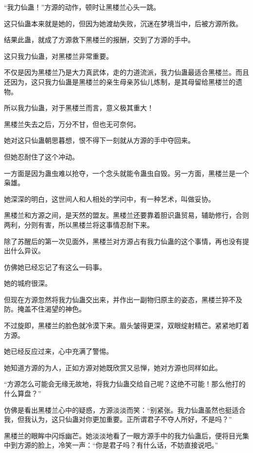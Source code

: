 
\begin{this_body}

“我力仙蛊！”方源的动作，顿时让黑楼兰心头一跳。

这只仙蛊本来就是她的，但因为她渡劫失败，沉迷在梦境当中，后被方源所救。

结果此蛊，就成了方源救下黑楼兰的报酬，交到了方源的手中。

这只我力仙蛊，对黑楼兰非常重要。

不仅是因为黑楼兰乃是大力真武体，走的力道流派，我力仙蛊最适合黑楼兰。而且还因为，这只我力仙蛊是黑楼兰的亲生母亲苏仙儿炼制，是其母留给黑楼兰的遗物。

所以我力仙蛊，对于黑楼兰而言，意义极其重大！

黑楼兰失去之后，万分不甘，但也无可奈何。

她对这只仙蛊朝思暮想，恨不得下一刻就从方源的手中夺回来。

但她忍耐住了这个冲动。

一方面是因为蛊虫难以抢夺，一个念头就能令蛊虫自毁。另一方面，黑楼兰是一个枭雄。

她深深的明白，这世间人和人相处的学问中，有一种艺术，叫做妥协。

黑楼兰和方源之间，是天然的盟友。黑楼兰还要靠着胆识蛊贸易，辅助修行，合则两利，分则有害，所以黑楼兰将这事情忍耐下来。

除了苏醒后的第一次见面外，黑楼兰对方源占有我力仙蛊的这个事情，再也没有提出什么异议。

仿佛她已经忘记了有这么一码事。

她的城府很深。

但现在方源忽然将我力仙蛊交出来，并作出一副物归原主的姿态，黑楼兰猝不及防。掩盖不住渴望的神色。

不过旋即，黑楼兰的脸色就冷漠下来。眉头皱得更深，双眼绽射精芒。紧紧地盯着方源。

她已经反应过来，心中充满了警惕。

她知道方源的为人，正如方源对她既欣赏又忌惮，她对方源也同样如此。

“方源怎么可能会无缘无故地，将我力仙蛊交给自己呢？这绝不可能！那么他打的什么算盘？”

仿佛是看出黑楼兰心中的疑惑，方源淡淡而笑：“别紧张。我力仙蛊虽然也挺适合我，但我认为，这只仙蛊对你更加重要。正所谓君子不夺人所好，不是吗？”

黑楼兰的眼眸中闪烁幽芒。她淡淡地看了一眼方源手中的我力仙蛊后，便将目光集中到方源的脸上，冷笑一声：“你是君子吗？有什么话，不妨直接说吧。”


\end{this_body}
